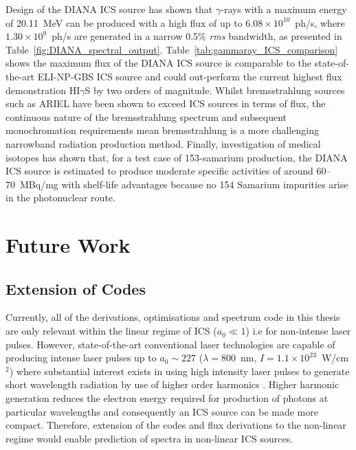 \documentclass[../main.tex]{subfiles}
\begin{document}
Design of the DIANA ICS source has shown that $\gamma$-rays with a maximum energy of 20.11~\si{\mega\electronvolt} can be produced with a high flux of up to $6.08\times 10^{10}$~ph/\si{\second}, where $1.30\times 10^{9}$~ph/\si{\second} are generated in a narrow 0.5\% \textit{rms} bandwidth, as presented in Table~\ref{fig:DIANA_spectral_output}. Table~\ref{tab:gammaray_ICS_comparison} shows the maximum flux of the DIANA ICS source is comparable to the state-of-the-art ELI-NP-GBS \cite{elinp2019vega,tanaka2020current} ICS source and could out-perform the current highest flux demonstration HI$\gamma$S \cite{weller2009research} by two orders of magnitude. Whilst bremsstrahlung sources such as ARIEL \cite{dilling2013ariel,lebois2011simulations} have been shown to exceed ICS sources in terms of flux, the continuous nature of the bremsstrahlung spectrum and subsequent monochromation requirements mean bremsstrahlung is a more challenging narrowband radiation production method. Finally, investigation of medical isotopes has shown that, for a test case of 153-samarium production, the DIANA ICS source is estimated to produce moderate specific activities of around 60--70~\si{\mega\becquerel}/\si{\milli\gram} with shelf-life advantages because no 154 Samarium impurities arise in the photonuclear route. 

\section{Future Work}

\subsection{Extension of Codes}
Currently, all of the derivations, optimisations and spectrum code in this thesis are only relevant within the linear regime of ICS ($a_{0}\ll 1$) i.e for non-intense laser pulses. However, state-of-the-art conventional laser technologies are capable of producing intense laser pulses up to $a_{0}\sim227$ \cite{yoon2021realization} ($\lambda = 800$~\si{\nano\meter}, $I = 1.1\times 10^{23}$~\si{\watt}/\si{\centi\meter}$^{2}$) where substantial interest exists in using high intensity laser pulses to generate short wavelength radiation by use of higher order harmonics \cite{babzien2006observation,seipt2011nonlinear}. Higher harmonic generation reduces the electron energy required for production of photons at particular wavelengths and consequently an ICS source can be made more compact. Therefore, extension of the codes and flux derivations to the non-linear regime would enable prediction of spectra in non-linear ICS sources. 
\end{document}
